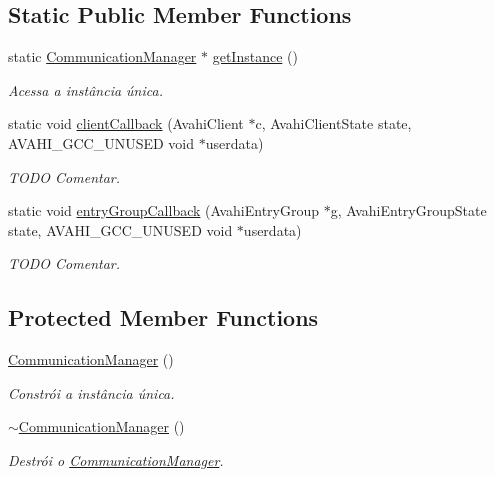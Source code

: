 \subsection*{Static Public Member Functions}
\begin{DoxyCompactItemize}
\item 
static \hyperlink{classbr_1_1ufscar_1_1lince_1_1mmi_1_1zeroconf_1_1CommunicationManager}{CommunicationManager} $\ast$ \hyperlink{classbr_1_1ufscar_1_1lince_1_1mmi_1_1zeroconf_1_1CommunicationManager_ae9d111bd7e4f269a80deee7bbe9c9fcd}{getInstance} ()
\begin{DoxyCompactList}\small\item\em Acessa a instância única. \item\end{DoxyCompactList}\item 
static void \hyperlink{classbr_1_1ufscar_1_1lince_1_1mmi_1_1zeroconf_1_1CommunicationManager_ac7e195d0638ae6794150c9efb146259c}{clientCallback} (AvahiClient $\ast$c, AvahiClientState state, AVAHI\_\-GCC\_\-UNUSED void $\ast$userdata)
\begin{DoxyCompactList}\small\item\em TODO Comentar. \item\end{DoxyCompactList}\item 
static void \hyperlink{classbr_1_1ufscar_1_1lince_1_1mmi_1_1zeroconf_1_1CommunicationManager_a53b4fbff9b68d1c90d2b6f9da2ec7da9}{entryGroupCallback} (AvahiEntryGroup $\ast$g, AvahiEntryGroupState state, AVAHI\_\-GCC\_\-UNUSED void $\ast$userdata)
\begin{DoxyCompactList}\small\item\em TODO Comentar. \item\end{DoxyCompactList}\end{DoxyCompactItemize}
\subsection*{Protected Member Functions}
\begin{DoxyCompactItemize}
\item 
\hyperlink{classbr_1_1ufscar_1_1lince_1_1mmi_1_1zeroconf_1_1CommunicationManager_a4bb343041bd8a27f7640a3a0405459f7}{CommunicationManager} ()
\begin{DoxyCompactList}\small\item\em Constrói a instância única. \item\end{DoxyCompactList}\item 
\hyperlink{classbr_1_1ufscar_1_1lince_1_1mmi_1_1zeroconf_1_1CommunicationManager_adc5185400454d122aa325f2e79017eba}{$\sim$CommunicationManager} ()
\begin{DoxyCompactList}\small\item\em Destrói o \hyperlink{classbr_1_1ufscar_1_1lince_1_1mmi_1_1zeroconf_1_1CommunicationManager}{CommunicationManager}. \item\end{DoxyCompactList}\end{DoxyCompactItemize}

